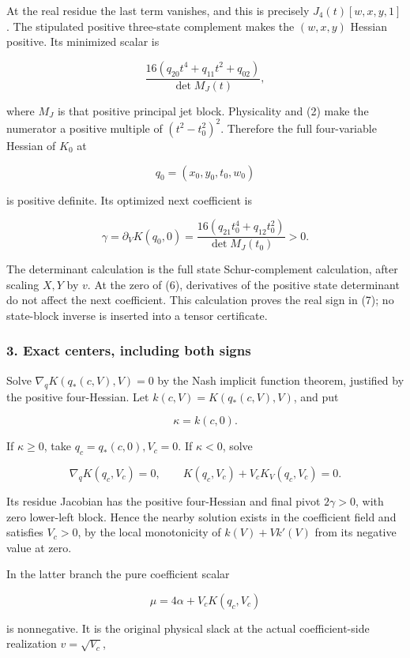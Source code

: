 At the real residue the last term vanishes, and this is precisely
\(J_4(t)[w,x,y,1]\). The stipulated positive three-state complement makes
the \((w,x,y)\) Hessian positive. Its minimized scalar is

\[
\frac{16(q_{20}t^4+q_{11}t^2+q_{02})}{\det M_J(t)},
\tag{6}
\]

where \(M_J\) is that positive principal jet block. Physicality and (2)
make the numerator a positive multiple of \((t^2-t_0^2)^2\). Therefore
the full four-variable Hessian of \(K_0\) at

\[
q_0=(x_0,y_0,t_0,w_0)
\]

is positive definite. Its optimized next coefficient is

\[
\gamma=\partial_V K(q_0,0)
=\frac{16(q_{21}t_0^4+q_{12}t_0^2)}{\det M_J(t_0)}>0.
\tag{7}
\]

The determinant calculation is the full state Schur-complement calculation,
after scaling \(X,Y\) by \(v\). At the zero of (6), derivatives of the
positive state determinant do not affect the next coefficient. This
calculation proves the real sign in (7); no state-block inverse is inserted
into a tensor certificate.

\hypertarget{exact-centers-including-both-signs}{%
\subsubsection*{3. Exact centers, including both signs}\label{p03b551f2a9a0:exact-centers-including-both-signs}}

Solve \(\nabla_qK(q_*(c,V),V)=0\) by the Nash implicit function theorem, justified by the positive
four-Hessian. Let \(k(c,V)=K(q_*(c,V),V)\), and put

\[
\kappa=k(c,0).
\]

If \(\kappa\ge0\), take \(q_c=q_*(c,0),V_c=0\). If \(\kappa<0\), solve

\[
\nabla_qK(q_c,V_c)=0,\qquad
K(q_c,V_c)+V_c K_V(q_c,V_c)=0.
\tag{8}
\]

Its residue Jacobian has the positive four-Hessian and final pivot
\(2\gamma>0\), with zero lower-left block. Hence the nearby solution
exists in the coefficient field and satisfies \(V_c>0\), by the local
monotonicity of \(k(V)+Vk'(V)\) from its negative value at zero.

In the latter branch the pure coefficient scalar

\[
\mu=4\alpha+V_cK(q_c,V_c)
\tag{9}
\]

is nonnegative. It is the original physical slack at the actual
coefficient-side realization \(v=\sqrt{V_c}\),

